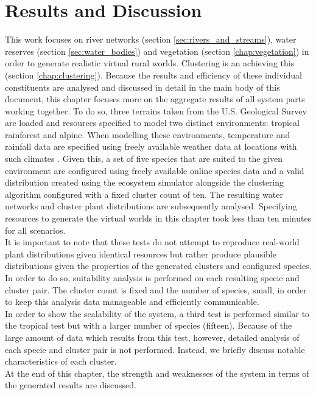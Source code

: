 \chapter{Results and Discussion} \label{chap:results}

This work focuses on river networks (section \ref{sec:rivers_and_streams}), water reserves (section \ref{sec:water_bodies}) and vegetation (section \ref{chap:vegetation}) in order to generate realistic virtual rural worlds. Clustering is an achieving this (section \ref{chap:clustering}). Because the results and efficiency of these individual constituents are analysed and discussed in detail in the main body of this document, this chapter focuses more on the aggregate results of all system parts working together. To do so, three terrains taken from the U.S. Geological Survey \protect\footnotemark {} are loaded and resources specified to model two distinct environments: tropical rainforest and alpine. When modelling these environments, temperature and rainfall data are specified using freely available weather data at locations with such climates \protect\footnotemark {}. Given this, a set of five species that are suited to the given environment are configured using freely available online species data  \protect\footnotemark {} and a valid distribution created using the ecosystem simulator alongside the clustering algorithm configured with a fixed cluster count of ten. The resulting water networks and cluster plant distributions are subsequently analysed. Specifying resources to generate the virtual worlds in this chapter took less than ten minutes for all scenarios.  \\

It is important to note that these tests do not attempt to reproduce real-world plant distributions given identical resources but rather produce plausible distributions given the properties of the generated clusters and configured species. In order to do so, suitability analysis is performed on each resulting specie and cluster pair. The cluster count is fixed and the number of species, small, in order to keep this analysis data manageable and efficiently communicable. \\

In order to show the scalability of the system, a third test is performed similar to the tropical test but with a larger number of species (fifteen). Because of the large amount of data which results from this test, however, detailed analysis of each specie and cluster pair is not performed. Instead, we briefly discuss notable characteristics of each cluster.\\

At the end of this chapter, the strength and weaknesses of the system in terms of the generated results are discussed.\\

